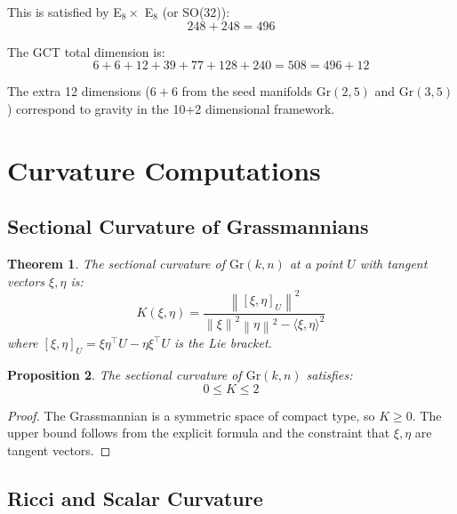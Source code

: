 \documentclass[11pt,a4paper]{article}
\newtheorem{theorem}{Theorem}[section]
\newtheorem{proposition}[theorem]{Proposition}
\newcommand{\Gr}{\mathrm{Gr}}
\newcommand{\norm}[1]{\left\|#1\right\|}
\newcommand{\inner}[2]{\langle #1, #2 \rangle}
\begin{document}
This is satisfied by E$_8 \times$ E$_8$ (or SO(32)):
\begin{equation}
    248 + 248 = 496
\end{equation}

The GCT total dimension is:
\begin{equation}
    6 + 6 + 12 + 39 + 77 + 128 + 240 = 508 = 496 + 12
\end{equation}

The extra 12 dimensions ($6 + 6$ from the seed manifolds $\Gr(2,5)$ and $\Gr(3,5)$) correspond to gravity in the 10+2 dimensional framework.

\section{Curvature Computations}

\subsection{Sectional Curvature of Grassmannians}

\begin{theorem}
The sectional curvature of $\Gr(k,n)$ at a point $U$ with tangent vectors $\xi, \eta$ is:
\begin{equation}
    K(\xi, \eta) = \frac{\norm{[\xi, \eta]_U}^2}{\norm{\xi}^2\norm{\eta}^2 - \inner{\xi}{\eta}^2}
\end{equation}
where $[\xi, \eta]_U = \xi \eta^\top U - \eta \xi^\top U$ is the Lie bracket.
\end{theorem}

\begin{proposition}
The sectional curvature of $\Gr(k,n)$ satisfies:
\begin{equation}
    0 \leq K \leq 2
\end{equation}
\end{proposition}

\begin{proof}
The Grassmannian is a symmetric space of compact type, so $K \geq 0$. The upper bound follows from the explicit formula and the constraint that $\xi, \eta$ are tangent vectors.
\end{proof}

\subsection{Ricci and Scalar Curvature}
\end{document}
